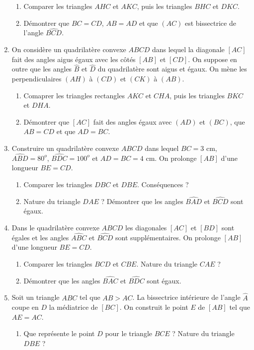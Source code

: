 \documentclass[12 pt]{report}
\theoremstyle{plain}
\newcounter{n}
\begin{document}
\begin{enumerate}
\begin{enumerate}
\item Comparer les triangles $AHC$ et $AKC$, puis les triangles $BHC$ et $DKC$.
\item Démontrer que $BC=CD$, $AB=AD$ et que $(AC)$ est bissectrice de l'angle
$\widehat{BCD}$.
\end{enumerate}
\item On considère un quadrilatère convexe $ABCD$ dans lequel la diagonale $[AC]$ 
fait des angles aigus égaux avec les côtés $[AB]$ et $[CD]$. On suppose en outre que les angles $\widehat{B}$ et $\widehat{D}$ du quadrilatère sont aigus et égaux. On mène les perpendiculaires $(AH)$ à $(CD)$ et $(CK)$ à $(AB)$.\begin{enumerate}
\item Comaprer les triangles rectangles $AKC$ et $CHA$, puis les triangles $BKC$ et $DHA$. \item Démontrer que $[AC]$ fait des angles égaux avec $(AD)$ et $(BC)$, que $AB=CD$ et que $AD=BC$.
\end{enumerate}
\item Construire un quadrilatère convexe $ABCD$ dans lequel $BC=3$ cm, $\widehat{ABD}=80^o$, $\widehat{BDC}=100^o$ et $AD=BC=4$ cm. On prolonge $[AB]$ d'une longueur $BE=CD$. \begin{enumerate}
\item Comparer les triangles $DBC$ et $DBE$. Conséquences ? 
\item Nature du triangle $DAE$ ? Démontrer que les angles $\widehat{BAD}$ et $\widehat{BCD}$ sont égaux.
\end{enumerate}
\item Dans le quadrilatère convexe $ABCD$ les diagonales $[AC]$ et $[BD]$ sont égales et les angles $\widehat{ABC}$ et $\widehat{BCD}$ sont supplémentaires. On prolonge $[AB]$ d'une longueur $BE=CD$. \begin{enumerate}
\item Comparer les triangles $BCD$ et $CBE$. Nature du triangle $CAE$ ? 
\item Démontrer que les angles $\widehat{BAC}$ et $\widehat{BDC}$ sont égaux.
\end{enumerate}
\item Soit un triangle $ABC$ tel que $AB>AC$. La bissectrice intérieure de l'angle
$\widehat{A}$ coupe en $D$ la médiatrice de $[BC]$. On construit le point $E$ de $[AB]$ tel que $AE=AC$. \begin{enumerate}
\item Que représente le point $D$ pour le triangle $BCE$ ? Nature du triangle $DBE$ ?

\end{enumerate}
\end{enumerate}
\end{document}
